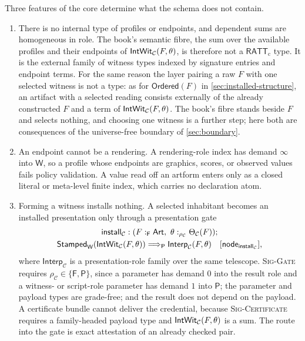 \documentclass[11pt]{article}
\numberwithin{equation}{section}
\theoremstyle{definition}
\theoremstyle{plain}
\theoremstyle{remark}
\newcommand{\RATT}{\mathsf{RATT}_{\mathrm c}}
\newcommand{\Stamped}{\mathsf{Stamped}}
\newcommand{\Frm}{\mathsf F}
\newcommand{\Prs}{\mathsf P}
\newcommand{\Wit}{\mathsf W}
\newcommand{\absent}{\boldsymbol\infty}
\begin{document}
Three features of the core determine what the schema does not contain.
\begin{enumerate}[label=(\roman*),leftmargin=2.5em]
\item There is no internal type of profiles or endpoints, and dependent sums
are homogeneous in role.  The book's semantic fibre, the sum
over the available profiles and their endpoints of
\({\mathsf{IntWit}}_{\mathcal C}(F,\theta)\), is therefore not a \(\RATT\)
type.  It is the external family of witness types indexed by signature
entries and endpoint terms.  For the same reason the layer pairing a raw
\(F\) with one selected witness is not a type: as for
\(\mathsf{Ordered}(F)\) in \cref{sec:installed-structure}, an artifact with
a selected reading consists externally of the already constructed \(F\) and
a term of \({\mathsf{IntWit}}_{\mathcal C}(F,\theta)\).  The book's fibre stands
beside \(F\) and selects nothing, and choosing one witness is a further step;
here both are consequences of the universe-free boundary of
\cref{sec:boundary}.
\item An endpoint cannot be a rendering.  A rendering-role index has demand
\(\absent\) into \(\Wit\), so a profile whose endpoints are graphics, scores,
or observed values fails policy validation.  A value read off an artform
enters only as a closed literal or meta-level finite index, which carries no
declaration atom.
\item Forming a witness installs nothing.  A selected inhabitant becomes
an installed presentation only through a presentation gate
\[
\begin{gathered}
 \mathsf{install}_{\mathcal C}:
 (F:_{\Frm}\mathsf{Art},\ \theta:_{\rho_{\mathcal C}}\Theta_{\mathcal C}(F));\\
 \Stamped_\Wit(\AFIntWit_{\mathcal C}(F,\theta))
 \Longrightarrow_{\Prs}\mathsf{Interp}_{\mathcal C}(F,\theta)
 \quad[\mathsf{node}_{\mathsf{install}_{\mathcal C}}],
\end{gathered}
\]
where \(\mathsf{Interp}_{\mathcal C}\) is a presentation-role family over the
same telescope.  \textsc{Sig-Gate} requires
\(\rho_{\mathcal C}\in\{\Frm,\Prs\}\), since a parameter has demand \(0\)
into the result role and a witness- or script-role parameter has demand
\(1\) into \(\Prs\); the parameter and payload types are grade-free; and the
result does not depend on the payload.  A certificate
bundle cannot deliver the credential, because \textsc{Sig-Certificate}
requires a family-headed payload type and
\({\mathsf{IntWit}}_{\mathcal C}(F,\theta)\) is a sum.  The route into the
gate is exact attestation of an already checked pair.
\end{enumerate}
\end{document}
